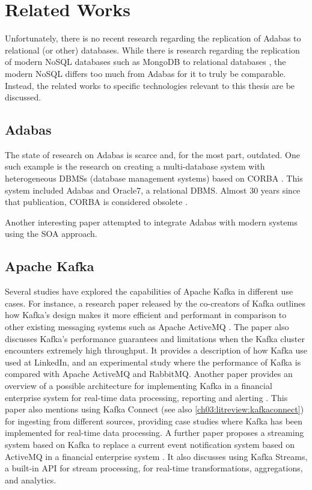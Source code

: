 \chapter{Related Works}
\label{ch03:litreview}
Unfortunately, there is no recent research regarding the replication of Adabas to relational (or other) databases. While there is research regarding the replication of modern NoSQL databases such as MongoDB to relational databases \cite{aftabnosqletltordbms}, the modern NoSQL differs too much from Adabas for it to truly be comparable. Instead, the related works to specific technologies relevant to this thesis are be discussed.

\section{Adabas}
\label{ch03:litreview:adabas}
The state of research on Adabas is scarce and, for the most part, outdated. One such example is the research on creating a multi-database system with heterogeneous DBMSs (database management systems) based on \ac{CORBA} \cite{ozhan1996making}. This system included Adabas and Oracle7, a relational DBMS. Almost 30 years since that publication, \ac{CORBA} is considered obsolete \cite{fallofcorba}.

Another interesting paper attempted to integrate Adabas with modern systems using the \ac{SOA} approach.

\section{Apache Kafka}
Several studies have explored the capabilities of Apache Kafka in different use cases. For instance, a research paper released by the co-creators of Kafka outlines how Kafka's design makes it more efficient and performant in comparison to other existing messaging systems such as Apache ActiveMQ \cite{kreps2011kafka}. The paper also discusses Kafka's performance guarantees and limitations when the Kafka cluster encounters extremely high throughput. It provides a description of how Kafka use used at LinkedIn, and an experimental study where the performance of Kafka is compared with Apache ActiveMQ and RabbitMQ. Another paper provides an overview of a possible architecture for implementing Kafka in a financial enterprise system for real-time data processing, reporting and alerting \cite{peddireddystreamliningprocessingkafka}. This paper also mentions using Kafka Connect (see also \ref{ch03:litreview:kafkaconnect}) for ingesting from different sources, providing case studies where Kafka has been implemented for real-time data processing. A further paper proposes a streaming system based on Kafka to replace a current event notification system based on ActiveMQ in a financial enterprise system \cite{sanjanaenterprise}. It also discusses using Kafka Streams, a built-in API for stream processing, for real-time transformations, aggregations, and analytics.

